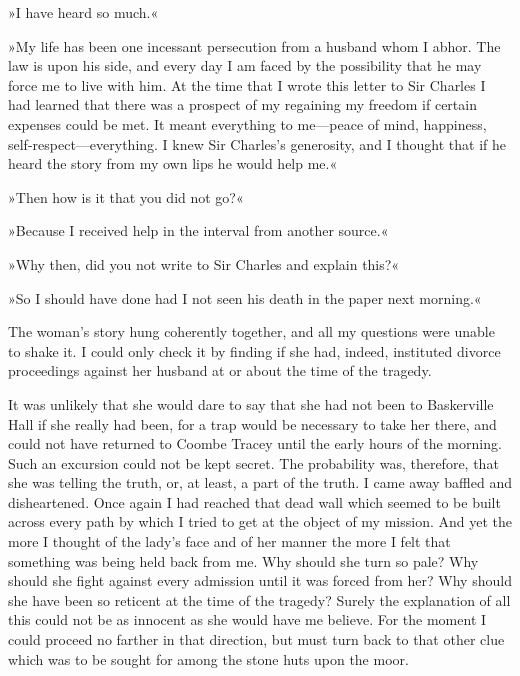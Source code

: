 »I have heard so much.«

»My life has been one incessant persecution from a husband whom I abhor. The law is upon his side, and every day I am faced by the possibility that he may force me to live with him. At the time that I wrote this letter to Sir Charles I had learned that there was a prospect of my regaining my freedom if certain expenses could be met. It meant everything to me\allowbreak---\allowbreak peace of mind, happiness, self-respect\allowbreak---\allowbreak everything. I knew Sir Charles's generosity, and I thought that if he heard the story from my own lips he would help me.«

»Then how is it that you did not go?«

»Because I received help in the interval from another source.«

»Why then, did you not write to Sir Charles and explain this?«

»So I should have done had I not seen his death in the paper next morning.«

The woman's story hung coherently together, and all my questions were unable to shake it. I could only check it by finding if she had, indeed, instituted divorce proceedings against her husband at or about the time of the tragedy.

It was unlikely that she would dare to say that she had not been to Baskerville Hall if she really had been, for a trap would be necessary to take her there, and could not have returned to Coombe Tracey until the early hours of the morning. Such an excursion could not be kept secret. The probability was, therefore, that she was telling the truth, or, at least, a part of the truth. I came away baffled and disheartened. Once again I had reached that dead wall which seemed to be built across every path by which I tried to get at the object of my mission. And yet the more I thought of the lady's face and of her manner the more I felt that something was being held back from me. Why should she turn so pale? Why should she fight against every admission until it was forced from her? Why should she have been so reticent at the time of the tragedy? Surely the explanation of all this could not be as innocent as she would have me believe. For the moment I could proceed no farther in that direction, but must turn back to that other clue which was to be sought for among the stone huts upon the moor.

